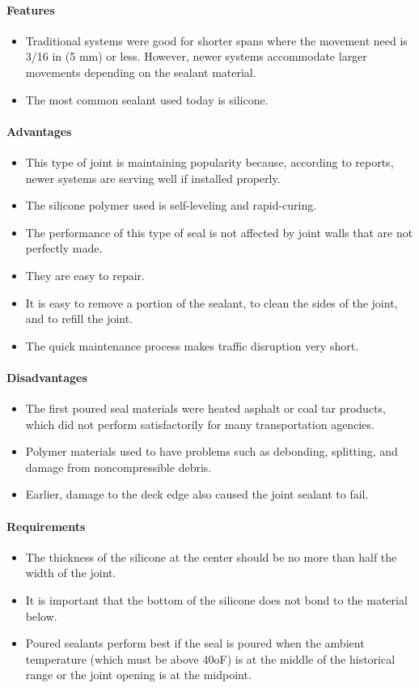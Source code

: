 \paragraph{Features}
\begin{itemize}
  \item Traditional systems were good for shorter spans where the movement need is 3/16 in (5 mm) or less. However, newer systems accommodate larger movements depending on the sealant material.
  \item The most common sealant used today is silicone.
\end{itemize}
\paragraph{Advantages}
\begin{itemize}
  \item This type of joint is maintaining popularity because, according to reports, newer systems are serving well if installed properly.
  \item The silicone polymer used is self-leveling and rapid-curing.
  \item The performance of this type of seal is not affected by joint walls that are not perfectly made.
  \item They are easy to repair.
  \item It is easy to remove a portion of the sealant, to clean the sides of the joint, and to refill the joint.
  \item The quick maintenance process makes traffic disruption very short.
\end{itemize}
\paragraph{Disadvantages}
\begin{itemize}
  \item The first poured seal materials were heated asphalt or coal tar products, which did not perform satisfactorily
  for many transportation agencies.
  \item Polymer materials used to have problems such as debonding, splitting, and damage from noncompressible
  debris.
  \item Earlier, damage to the deck edge also caused the joint sealant to fail.
\end{itemize}
\paragraph{Requirements}
\begin{itemize}
  \item The thickness of the silicone at the center should be no more than half the width of the joint.
  \item It is important that the bottom of the silicone does not bond to the material below.
  \item Poured sealants perform best if the seal is poured when the ambient temperature (which must be above 40oF)
  is at the middle of the historical range or the joint opening is at the midpoint.
\end{itemize}

